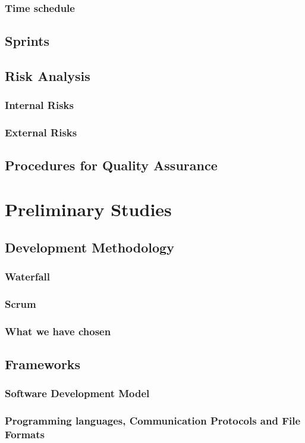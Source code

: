 \documentclass[12pt, a4paper]{article}
\begin{document}
\subsubsection{Time schedule}
\subsection{Sprints}
\subsection{Risk Analysis}
\subsubsection{Internal Risks}
\subsubsection{External Risks}
\subsection{Procedures for Quality Assurance}

\section{Preliminary Studies}
\subsection{Development Methodology}
\subsubsection{Waterfall}
\subsubsection{Scrum}
\subsubsection{What we have chosen}
\subsection{Frameworks}
\subsubsection{Software Development Model}
\subsubsection{Programming languages, Communication Protocols and File Formats}
\end{document}
